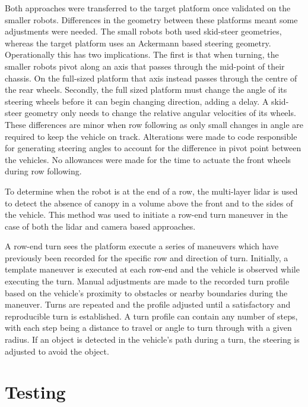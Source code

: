 \documentclass[preprint,authoryear,12pt]{elsarticle}
\begin{document}
    Both approaches were transferred to the target platform once validated on the smaller robots.
    Differences in the geometry between these platforms meant some adjustments were needed.
    The small robots both used skid-steer geometries, whereas the target platform uses an Ackermann based steering geometry.
    Operationally this has two implications.
    The first is that when turning, the smaller robots pivot along an axis that passes through the mid-point of their chassis.
    On the full-sized platform that axis instead passes through the centre of the rear wheels.
    Secondly, the full sized platform must change the angle of its steering wheels before it can begin changing direction, adding a delay.
    A skid-steer geometry only needs to change the relative angular velocities of its wheels.
    These differences are minor when row following as only small changes in angle are required to keep the vehicle on track.
    Alterations were made to code responsible for generating steering angles to account for the difference in pivot point between the vehicles.
    No allowances were made for the time to actuate the front wheels during row following.

    To determine when the robot is at the end of a row, the multi-layer lidar is used to detect the absence of canopy in a volume above the front and to the sides of the vehicle.
    This method was used to initiate a row-end turn maneuver in the case of both the lidar and camera based approaches.

    A row-end turn sees the platform execute a series of maneuvers which have previously been recorded for the specific row and direction of turn.
    Initially, a template maneuver is executed at each row-end and the vehicle is observed while executing the turn.
    Manual adjustments are made to the recorded turn profile based on the vehicle's proximity to obstacles or nearby boundaries during the maneuver.
    Turns are repeated and the profile adjusted until a satisfactory and reproducible turn is established.
    A turn profile can contain any number of steps, with each step being a distance to travel or angle to turn through with a given radius.
    If an object is detected in the vehicle's path during a turn, the steering is adjusted to avoid the object.


\section{Testing}
\label{sub:testing}
\end{document}
